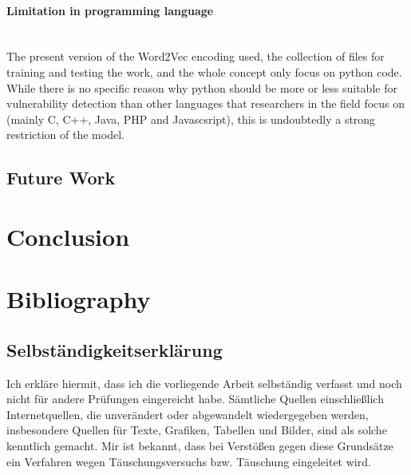 \documentclass[
	a4paper,
	pagesize,
	pdftex,
	12pt,
	twoside, %
	BCOR=5mm, %
	ngerman,
	fleqn,
	final,
	]{scrartcl}
\begin{document}
\paragraph{Limitation in programming language}\mbox{}\\
The present version of the Word2Vec encoding used, the collection of files for training and testing the work, and the whole concept only focus on python code. While there is no specific reason why python should be more or less suitable for vulnerability detection than other languages that researchers in the field focus on (mainly C, C++, Java, PHP and Javascsript), this is undoubtedly a strong restriction of the model.


\subsection{Future Work}




\section{Conclusion}



\section{Bibliography}






\cleardoublepage%
{\parindent0cm
	\subsection*{Selbständigkeitserklärung}
	Ich erkläre hiermit, dass ich die vorliegende Arbeit selbständig verfasst
	und noch nicht für andere Prüfungen eingereicht habe.
	Sämtliche Quellen einschließlich Internetquellen, die unverändert oder
	abgewandelt wiedergegeben werden, insbesondere Quellen für Texte, Grafiken,
	Tabellen und Bilder, sind als solche kenntlich gemacht. Mir ist bekannt,
	dass bei Verstößen gegen diese Grundsätze ein Verfahren wegen
	Täuschungsversuchs bzw. Täuschung eingeleitet wird.
	\vspace{3\baselineskip}
	
}
\end{document}

